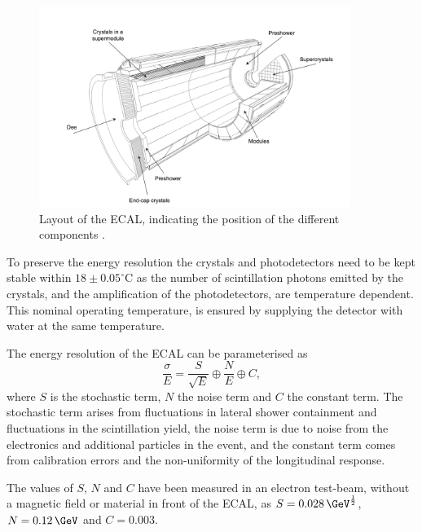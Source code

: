 \begin{figure}[h!]
\begin{center}
\includegraphics[width=0.9\textwidth]{./Detector/Plots/ECAL.png}
\caption[Layout of the ECAL, indicating the positions
of the different components.]{Layout of the \ac{ECAL}, indicating the position of the
different components \cite{cms-jinst}.}
\label{fig:CMS_ECAL}
\end{center}
\end{figure}

To preserve the energy resolution the crystals and
photodetectors need to be kept stable within $18\pm 0.05^{\circ}$C
as the number of scintillation photons emitted by the crystals,
and the amplification of the photodetectors, are temperature dependent.
This nominal operating temperature, is ensured by 
supplying the detector with water at the same temperature.

The energy resolution of the \ac{ECAL} can be parameterised as
\begin{equation}\label{eqn:ecalres}
\frac{\sigma}{E} = \frac{S}{\sqrt{E}}\oplus\frac{N}{E}\oplus C,
\end{equation}
where $S$ is the stochastic term, $N$ the noise term and $C$ the constant term.
The stochastic term arises from fluctuations in lateral shower containment and 
fluctuations in the scintillation yield, the noise term is due to noise from the electronics
and additional particles in the event, and the constant term comes
from calibration errors and the non-uniformity of the longitudinal response.

The values of $S$, $N$ and $C$ have been measured in an electron
test-beam, without a magnetic field or material in front of the \ac{ECAL}, as 
$S = 0.028\,\GeV^{\frac{1}{2}}$, $N = 0.12\,\GeV$ and $C= 0.003$.

